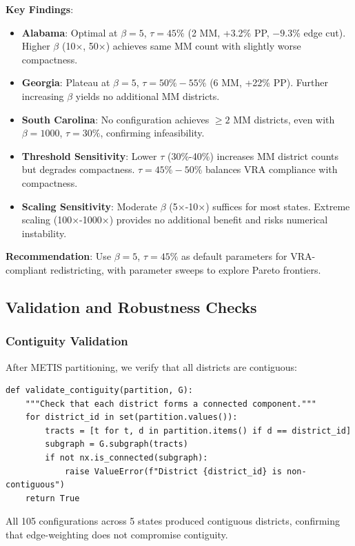 \textbf{Key Findings}:
\begin{itemize}
    \item \textbf{Alabama}: Optimal at $\beta = 5$, $\tau = 45\%$ (2 MM, +3.2\% PP, $-9.3$\% edge cut). Higher $\beta$ (10×, 50×) achieves same MM count with slightly worse compactness.
    \item \textbf{Georgia}: Plateau at $\beta = 5$, $\tau = 50\%-55\%$ (6 MM, +22\% PP). Further increasing $\beta$ yields no additional MM districts.
    \item \textbf{South Carolina}: No configuration achieves $\geq 2$ MM districts, even with $\beta = 1000$, $\tau = 30\%$, confirming infeasibility.
    \item \textbf{Threshold Sensitivity}: Lower $\tau$ (30\%-40\%) increases MM district counts but degrades compactness. $\tau = 45\%-50\%$ balances VRA compliance with compactness.
    \item \textbf{Scaling Sensitivity}: Moderate $\beta$ (5×-10×) suffices for most states. Extreme scaling (100×-1000×) provides no additional benefit and risks numerical instability.
\end{itemize}

\textbf{Recommendation}: Use $\beta = 5$, $\tau = 45\%$ as default parameters for VRA-compliant redistricting, with parameter sweeps to explore Pareto frontiers.

\subsection{Validation and Robustness Checks}

\subsubsection{Contiguity Validation}

After METIS partitioning, we verify that all districts are contiguous:

\begin{verbatim}
def validate_contiguity(partition, G):
    """Check that each district forms a connected component."""
    for district_id in set(partition.values()):
        tracts = [t for t, d in partition.items() if d == district_id]
        subgraph = G.subgraph(tracts)
        if not nx.is_connected(subgraph):
            raise ValueError(f"District {district_id} is non-contiguous")
    return True
\end{verbatim}

All 105 configurations across 5 states produced contiguous districts, confirming that edge-weighting does not compromise contiguity.

